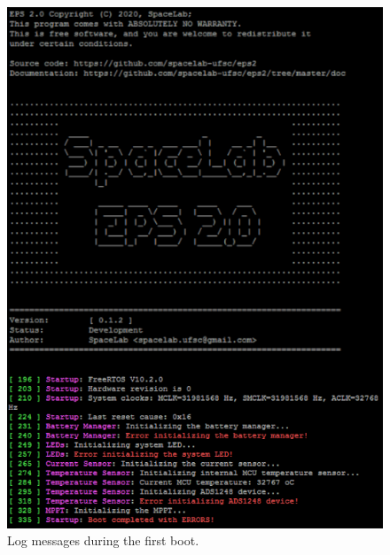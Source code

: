 \begin{figure}[!ht]
    \begin{center}
        \includegraphics[width=0.4\columnwidth]{figures/v01/log-first-boot.png}
        \caption{Log messages during the first boot.}
        \label{fig:log-first-boot}
    \end{center}
\end{figure}

